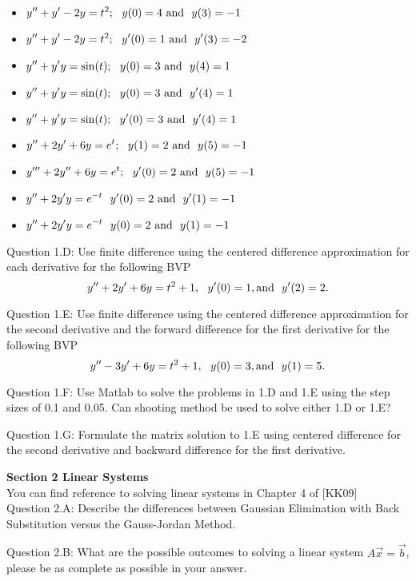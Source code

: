 \documentclass{article}
\renewcommand{\cite}[1]{[#1]}
\def\ds{\displaystyle}
\begin{document}
\begin{itemize}
\item $\ds y'' + y' - 2y = t^2; \ \ y(0)=4 \ {\rm and}\ \ y(3)=-1$
\item $\ds y'' + y' - 2y = t^2; \ \ y'(0)=1 \ {\rm and}\ \ y'(3)=-2$
\item $\ds y'' + y'y = \sin (t); \ \ y(0)=3 \ {\rm and}\ \ y(4)= 1$
\item $\ds y'' + y'y = \sin (t); \ \ y(0)=3 \ {\rm and}\ \ y'(4)= 1$
\item $\ds y'' + y'y = \sin (t); \ \ y'(0)=3 \ {\rm and}\ \ y'(4)= 1$
\item $\ds y'' + 2 y' + 6 y = e^t; \ \ y(1)=2 \ {\rm and}\ \ y(5)= -1$
\item $\ds y''' + 2 y'' + 6 y = e^t; \ \ y'(0)=2 \ {\rm and}\ \ y(5)= -1$
\item $\ds y'' + 2 y'y = e^{-t} \ \ y'(0)=2 \ {\rm and}\ \ y'(1)= -1$
\item $\ds y'' + 2 y'y = e^{-t} \ \ y(0)=2 \ {\rm and}\ \ y(1)= -1$
\end{itemize}
\par \medskip \noindent 
%
Question 1.D: Use finite difference using the centered difference approximation for each derivative for the following BVP
$$y'' + 2y' + 6y = t^2 + 1, \ \ y'(0)=1, {\rm and} \ \ y'(2) = 2.$$
\par \medskip \noindent 
%
Question 1.E:  Use finite difference using the centered difference approximation for the second derivative and the forward difference for the first derivative for the following BVP
$$y'' - 3y' + 6y = t^2 + 1, \ \ y(0)=3, {\rm and} \ \ y(1) = 5.$$
\par \medskip \noindent 
%
Question 1.F: Use Matlab to solve the problems in 1.D and 1.E using the step sizes of 0.1 and 0.05. Can shooting method be used to solve either 1.D or 1.E?
\par \medskip \noindent 
%
Question 1.G: Formulate the matrix solution to 1.E using centered difference for the second derivative and backward difference for the first derivative. 
\par \bigskip \par
{\bf Section 2 Linear Systems}  \\
You can find reference to solving linear systems in Chapter 4 of \cite{KK09} \\
%
Question 2.A:  Describe the differences between Gaussian Elimination with Back Substitution versus the Gauss-Jordan Method. 
\par \medskip \noindent 
%
Question 2.B:  What are the possible outcomes to solving a linear system $\ds A\vec x = \vec b$, please be as complete as possible in your answer.
\end{document}
